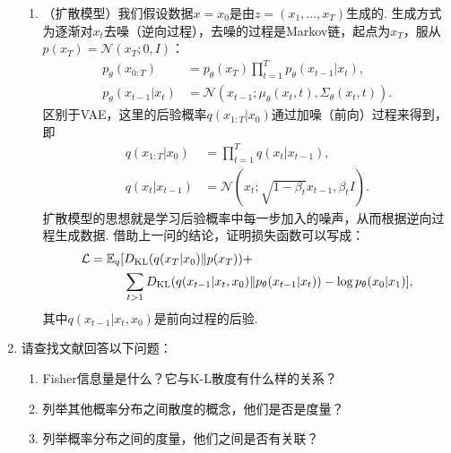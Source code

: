 \begin{enumerate}[wide, labelindent=0pt]
\begin{enumerate}
        \item （扩散模型）我们假设数据$x=x_{0}$是由$z=(x_{1},\dots,x_{T})$生成的. 生成方式为逐渐对$x_{t}$去噪（逆向过程），去噪的过程是Markov链，起点为$x_{T}$，服从$p(x_{T}) = \mathcal{N}(x_{T};0,I)$：
        \begin{align*}
            p_{\theta}(x_{0:T}) &= p_{\theta}(x_{T})\prod_{t=1}^{T}p_{\theta}(x_{t-1}|x_{t}),\\
            p_{\theta}(x_{t-1}|x_{t}) &= \mathcal{ N}(x_{t-1}; \mu_{\theta}(x_{t}, t), \Sigma_{\theta}(x_{t}, t)).
        \end{align*}
        区别于VAE，这里的后验概率$q(x_{1:T}|x_{0})$通过加噪（前向）过程来得到，即
        \begin{align*}
            q(x_{1:T}|x_{0}) &= \prod_{t=1}^{T}q(x_{t}|x_{t-1}),\\
            q(x_{t}|x_{t-1}) &= \mathcal{N}(x_{t}; \sqrt{1-\beta_{t}}x_{t-1}, \beta_{t}I).
        \end{align*}
        扩散模型的思想就是学习后验概率中每一步加入的噪声，从而根据逆向过程生成数据.
        借助上一问的结论，证明损失函数可以写成：
        \begin{align*}
            \mathcal{L} = \mathbb{E}_{q} [& D_{\mathrm{KL}}(q(x_{T}|x_{0}) \Vert p(x_{T})) +
            \\& \sum_{t>1} D_{\mathrm{KL}}(q(x_{t-1}|x_{t},x_{0}) \Vert p_{\theta}(x_{t-1}|x_{t})) - \log p_{\theta}(x_{0}|x_{1})
            ],
        \end{align*}
        其中$q(x_{t-1}|x_{t},x_{0})$是前向过程的后验.
    \end{enumerate}

    \item 请查找文献回答以下问题：
    \begin{enumerate}
        \item Fisher信息量是什么？它与K-L散度有什么样的关系？
        \item 列举其他概率分布之间散度的概念，他们是否是度量？
        \item 列举概率分布之间的度量，他们之间是否有关联？
    \end{enumerate}
    
\end{enumerate}